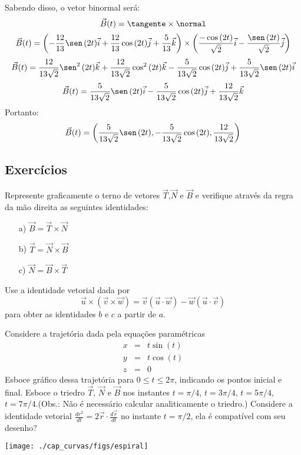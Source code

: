 Sabendo disso, o vetor binormal será:
\begin{equation*}
	\vec{B}(t)=\tangente\times\normal
\end{equation*}
\begin{equation*}
	\vec {B}(t)=\left(-\dfrac{12}{13}\sen\,(2t)\vec i+\dfrac{12}{13}\cos\,(2t)\vec j+\dfrac{5}{13}\vec k\right)\times\left(\dfrac{-\cos\,(2t)}{\sqrt{2}}\vec i-\dfrac{\sen\,(2t)}{\sqrt{2}}\vec j\right)
\end{equation*}
\begin{equation*}
	\vec {B}(t)=\dfrac{12}{13\sqrt{2}}\sen^2\,(2t)\vec k+\dfrac{12}{13\sqrt{2}}\cos^2\,(2t)\vec k-\dfrac{5}{13\sqrt{2}}\cos\,(2t)\vec j+\dfrac{5}{13\sqrt{2}}\sen\,(2t)\vec i
\end{equation*}
\begin{equation*}
	\vec {B}(t)=\dfrac{5}{13\sqrt{2}}\sen\,(2t)\vec i-\dfrac{5}{13\sqrt{2}}\cos\,(2t)\vec j+\dfrac{12}{13\sqrt{2}}\vec k
\end{equation*}
Portanto:
\begin{equation*}
	\vec{B}(t)=\left(\dfrac{5}{13\sqrt{2}}\sen\,(2t),-\dfrac{5}{13\sqrt{2}}\cos\,(2t),\dfrac{12}{13\sqrt{2}}\right)
\end{equation*}
\construirExeresol


\subsection*{Exercícios}

\begin{exer} Represente graficamente o terno de vetores $\vec{T}$,$\vec{N}$ e $\vec{B}$ e verifique através da regra da mão direita as seguintes identidades:
\begin{itemize}
\item[a)]$\vec{B}=\vec{T}\times\vec{N}$
\item[b)]$\vec{T}=\vec{N}\times\vec{B}$
\item[c)]$\vec{N}=\vec{B}\times\vec{T}$
\end{itemize}
Use a identidade vetorial dada por
$$\vec{u}\times\left(\vec{v}\times\vec{w}\right)=\vec{v}\left(\vec{u}\cdot\vec{w}\right)-\vec{w}\left(\vec{u}\cdot\vec{v}\right)$$ para obter as identidades $b$ e $c$ a partir de $a$.
\end{exer}


\begin{exer} Considere a trajetória dada pela equações paramétricas
\begin{eqnarray*}
x&=&t\sin (t)\\
y&=&t\cos (t)\\
z&=&0
\end{eqnarray*}
Esboce gráfico dessa trajetória para $0\leq t \leq 2\pi$, indicando os pontos inicial e final. Esboce o triedro $\vec{T}$, $\vec{N}$ e $\vec{B}$ nos instantes $t=\pi/4$, $t=3\pi/4$, $t=5\pi/4$, $t=7\pi/4$.(Obs.: Não é necessário calcular analiticamente o triedro.) Considere a identidade vetorial $\frac{d r^2}{dt}=2\vec{r}\cdot\frac{d\vec{r}}{dt}$ no instante $t=\pi/2$, ela é compatível com seu desenho?
\end{exer}
\begin{resp}
 \texttt{[image: ./cap\_curvas/figs/espiral]}
\end{resp}


